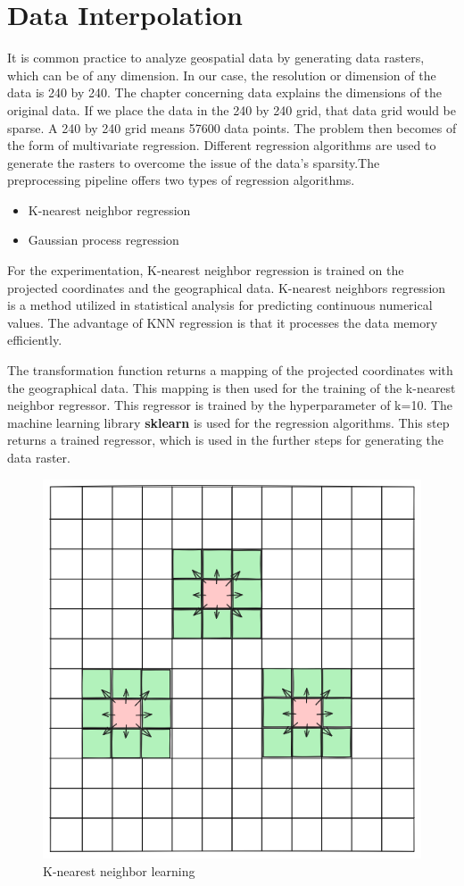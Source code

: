 \section{Data Interpolation }
It is common practice to analyze geospatial data by generating data rasters, which can be of any dimension. In our case, the resolution or dimension of the data is 240 by 240. The chapter concerning data explains the dimensions of the original data. If we place the data in the 240 by 240 grid, that data grid would be sparse. A 240 by 240 grid means 57600 data points. The problem then becomes of the form of multivariate regression. Different regression algorithms are used to generate the rasters to overcome the issue of the data's sparsity.The preprocessing pipeline offers two types of regression algorithms.

\begin{itemize}
    \item K-nearest neighbor regression
    \item Gaussian process regression
\end{itemize}
For the experimentation, K-nearest neighbor regression is trained on the projected coordinates and the geographical data. K-nearest neighbors regression is a method utilized in statistical analysis for predicting continuous numerical values. The advantage of KNN regression is that it processes the data memory efficiently.

The transformation function returns a mapping of the projected coordinates with the geographical data.
This mapping is then used for the training of the k-nearest neighbor regressor. This regressor is trained by the hyperparameter of k=10. The machine learning library \textbf{sklearn} is used for the regression algorithms.
This step returns a trained regressor, which is used in the further steps for generating the data raster.
\begin{figure}[h]
    \centering
    \includegraphics[width=0.5\linewidth]{figures/chapter-7/raster_interpolation.png}
    \caption{K-nearest neighbor learning}
    \label{fig:knn-learning}
\end{figure}

